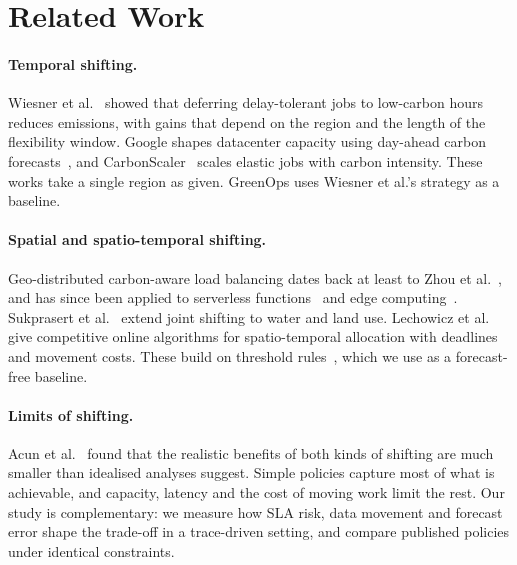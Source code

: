 \section{Related Work}
\label{sec:related}

\paragraph{Temporal shifting.}
Wiesner et al.~\cite{wiesner2021wait} showed that deferring
delay-tolerant jobs to low-carbon hours reduces emissions, with gains
that depend on the region and the length of the flexibility window.
Google shapes datacenter capacity using day-ahead carbon
forecasts~\cite{radovanovic2023carbon}, and CarbonScaler~\cite{hanafy2023carbonscaler}
scales elastic jobs with carbon intensity. These works take a single
region as given. GreenOps uses Wiesner et al.'s strategy as a baseline.

\paragraph{Spatial and spatio-temporal shifting.}
Geo-distributed carbon-aware load balancing dates back at least to
Zhou et al.~\cite{zhou2013carbon}, and has since been applied to
serverless functions~\cite{chadha2023greencourier,gsteiger2024caribou}
and edge computing~\cite{wu2025carbonedge}. Sukprasert et
al.~\cite{sukprasert2024spatiotemporal} extend joint shifting to water
and land use. Lechowicz et al.~\cite{lechowicz2024soad} give
competitive online algorithms for spatio-temporal allocation with
deadlines and movement costs. These build on threshold
rules~\cite{elyaniv2001search}, which we use as a forecast-free baseline.

\paragraph{Limits of shifting.}
Acun et al.~\cite{acun2024limitations} found that the realistic
benefits of both kinds of shifting are much smaller than idealised
analyses suggest. Simple policies capture most of what is achievable,
and capacity, latency and the cost of moving work limit the rest. Our
study is complementary: we measure how SLA risk, data movement and
forecast error shape the trade-off in a trace-driven setting, and
compare published policies under identical constraints.
